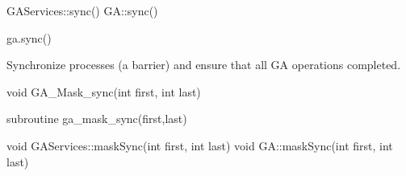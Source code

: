 \documentclass[10pt]{article}
\begin{document}
\begin{cxxapi}
\begin{cxxcode}
GAServices::sync()
GA::sync()
\end{cxxcode}
\end{cxxapi}

\begin{pyapi}
\begin{pycode}
ga.sync()
\end{pycode}
\end{pyapi}

\dcoll

\begin{desc}

Synchronize processes (a barrier) and ensure that all GA operations completed.

\end{desc}


\begin{capi}
\begin{ccode}
void GA_Mask_sync(int first, int last)
\end{ccode}
\begin{funcargs}
\end{funcargs}
\end{capi}

\begin{fapi}
\begin{fcode}
subroutine ga_mask_sync(first,last)
\end{fcode}
\begin{funcargs}
\end{funcargs}
\end{fapi}

\begin{cxxapi}
\begin{cxxcode}
void GAServices::maskSync(int first, int last)
void GA::maskSync(int first, int last)
\end{cxxcode}
\begin{funcargs}
\end{funcargs}
\end{cxxapi}
\end{document}
